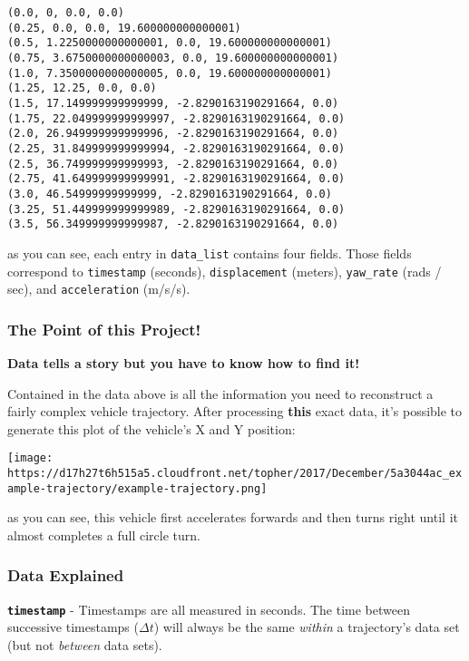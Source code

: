 \documentclass[11pt]{article}
\makeatletter
\def\maxwidth{\ifdim\Gin@nat@width>\linewidth\linewidth
    \else\Gin@nat@width\fi}
\let\Oldincludegraphics\includegraphics
\renewcommand{\includegraphics}[1]{\Oldincludegraphics[width=.8\maxwidth]{#1}}
\makeatother
\begin{document}
    \begin{Verbatim}[commandchars=\\\{\}]
(0.0, 0, 0.0, 0.0)
(0.25, 0.0, 0.0, 19.600000000000001)
(0.5, 1.2250000000000001, 0.0, 19.600000000000001)
(0.75, 3.6750000000000003, 0.0, 19.600000000000001)
(1.0, 7.3500000000000005, 0.0, 19.600000000000001)
(1.25, 12.25, 0.0, 0.0)
(1.5, 17.149999999999999, -2.8290163190291664, 0.0)
(1.75, 22.049999999999997, -2.8290163190291664, 0.0)
(2.0, 26.949999999999996, -2.8290163190291664, 0.0)
(2.25, 31.849999999999994, -2.8290163190291664, 0.0)
(2.5, 36.749999999999993, -2.8290163190291664, 0.0)
(2.75, 41.649999999999991, -2.8290163190291664, 0.0)
(3.0, 46.54999999999999, -2.8290163190291664, 0.0)
(3.25, 51.449999999999989, -2.8290163190291664, 0.0)
(3.5, 56.349999999999987, -2.8290163190291664, 0.0)

    \end{Verbatim}

    as you can see, each entry in \texttt{data\_list} contains four fields.
Those fields correspond to \texttt{timestamp} (seconds),
\texttt{displacement} (meters), \texttt{yaw\_rate} (rads / sec), and
\texttt{acceleration} (m/s/s).

\hypertarget{the-point-of-this-project}{%
\subsubsection{The Point of this
Project!}\label{the-point-of-this-project}}

\textbf{Data tells a story but you have to know how to find it!}

Contained in the data above is all the information you need to
reconstruct a fairly complex vehicle trajectory. After processing
\textbf{this} exact data, it's possible to generate this plot of the
vehicle's X and Y position:

\texttt{[image: https://d17h27t6h515a5.cloudfront.net/topher/2017/December/5a3044ac\_example-trajectory/example-trajectory.png]}

as you can see, this vehicle first accelerates forwards and then turns
right until it almost completes a full circle turn.

\hypertarget{data-explained}{%
\subsubsection{Data Explained}\label{data-explained}}

\textbf{\texttt{timestamp}} - Timestamps are all measured in seconds.
The time between successive timestamps (\(\Delta t\)) will always be the
same \emph{within} a trajectory's data set (but not \emph{between} data
sets).
\end{document}
